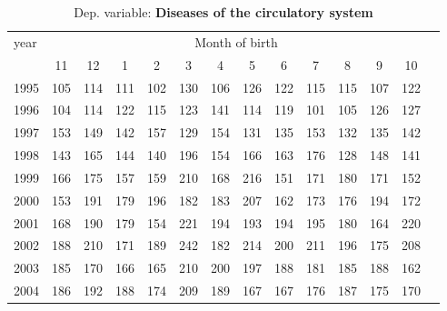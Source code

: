  \begin{table}[H] \begin{threeparttable} \centering \caption{Dep. variable: \textbf{Diseases of the circulatory system}} {\def\sym#1{\ifmmode^{#1}\else\(^{#1}\)\fi} \begin{tabular}{l*{13}{c}} \toprule year & \multicolumn{12}{c}{Month of birth} \\ \cmidrule(lr){2-13} 
            &          11&          12&           1&           2&           3&           4&           5&           6&           7&           8&           9&          10\\
1995        &         105&         114&         111&         102&         130&         106&         126&         122&         115&         115&         107&         122\\
1996        &         104&         114&         122&         115&         123&         141&         114&         119&         101&         105&         126&         127\\
1997        &         153&         149&         142&         157&         129&         154&         131&         135&         153&         132&         135&         142\\
1998        &         143&         165&         144&         140&         196&         154&         166&         163&         176&         128&         148&         141\\
1999        &         166&         175&         157&         159&         210&         168&         216&         151&         171&         180&         171&         152\\
2000        &         153&         191&         179&         196&         182&         183&         207&         162&         173&         176&         194&         172\\
2001        &         168&         190&         179&         154&         221&         194&         193&         194&         195&         180&         164&         220\\
2002        &         188&         210&         171&         189&         242&         182&         214&         200&         211&         196&         175&         208\\
2003        &         185&         170&         166&         165&         210&         200&         197&         188&         181&         185&         188&         162\\
2004        &         186&         192&         188&         174&         209&         189&         167&         167&         176&         187&         175&         170\\

\end{tabular}}
\end{threeparttable}
\end{table}
